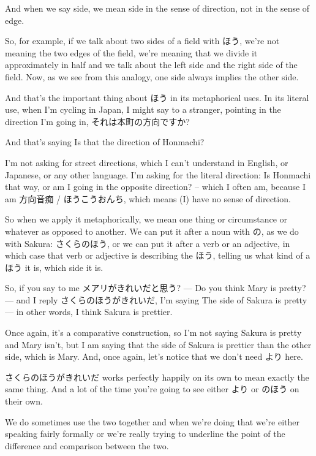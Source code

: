 And when we say side, we mean side in the sense of direction, not in the sense of edge.

{}

So, for example, if we talk about two sides of a field with ほう, we're not meaning the two edges of the field, we're meaning that we divide it approximately in half and we talk about the left side and the right side of the field. Now, as we see from this analogy, one side always implies the other side.

And that's the important thing about ほう in its metaphorical uses. In its literal use, when I'm cycling in Japan, I might say to a stranger, pointing in the direction I'm going in, それは本町の方向ですか?

And that's saying Is that the direction of Honmachi?

{}

I'm not asking for street directions, which I can't understand in English, or Japanese, or any other language. I'm asking for the literal direction: Is Honmachi that way, or am I going in the opposite direction? -- which I often am, because I am 方向音痴 / ほうこうおんち, which means (I) have no sense of direction.

So when we apply it metaphorically, we mean one thing or circumstance or whatever as opposed to another. We can put it after a noun with の, as we do with Sakura: さくらのほう, or we can put it after a verb or an adjective, in which case that verb or adjective is describing the ほう, telling us what kind of a ほう it is, which side it is.

So, if you say to me メアリがきれいだと思う? --- Do you think Mary is pretty? --- and I reply さくらのほうがきれいだ, I'm saying The side of Sakura is pretty --- in other words, I think Sakura is prettier.

{}

Once again, it's a comparative construction, so I'm not saying Sakura is pretty and Mary isn't, but I am saying that the side of Sakura is prettier than the other side, which is Mary. And, once again, let's notice that we don't need より here.

さくらのほうがきれいだ works perfectly happily on its own to mean exactly the same thing. And a lot of the time you're going to see either より or のほう on their own.

We do sometimes use the two together and when we're doing that we're either speaking fairly formally or we're really trying to underline the point of the difference and comparison between the two.

